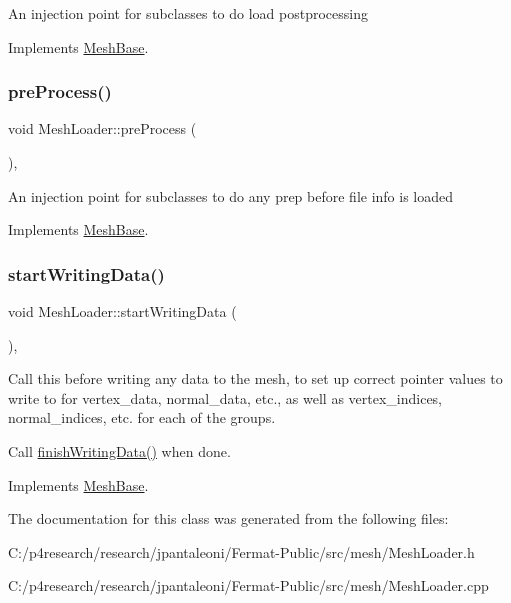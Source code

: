 An injection point for subclasses to do load postprocessing 

Implements \hyperlink{class_mesh_base_a49ec1a25d18103982974f424b77fadc0}{Mesh\+Base}.

\mbox{\label{class_mesh_loader_ad9c636920b31629f1c271b20a5fdc29b}} 
\subsubsection{\texorpdfstring{pre\+Process()}{preProcess()}}
{\footnotesize\ttfamily void Mesh\+Loader\+::pre\+Process (\begin{DoxyParamCaption}{ }\end{DoxyParamCaption})\hspace{0.3cm}{\ttfamily [protected]}, {\ttfamily [virtual]}}

An injection point for subclasses to do any prep before file info is loaded 

Implements \hyperlink{class_mesh_base_a25e192211e37cb69f9b5ce9aea25989a}{Mesh\+Base}.

\mbox{\label{class_mesh_loader_a18379e41707d8127947aa17a622d2807}} 
\subsubsection{\texorpdfstring{start\+Writing\+Data()}{startWritingData()}}
{\footnotesize\ttfamily void Mesh\+Loader\+::start\+Writing\+Data (\begin{DoxyParamCaption}{ }\end{DoxyParamCaption})\hspace{0.3cm}{\ttfamily [protected]}, {\ttfamily [virtual]}}

Call this before writing any data to the mesh, to set up correct pointer values to write to for vertex\+\_\+data, normal\+\_\+data, etc., as well as vertex\+\_\+indices, normal\+\_\+indices, etc. for each of the groups.

Call \hyperlink{class_mesh_loader_a65847db267f07f637deab0889c283bfa}{finish\+Writing\+Data()} when done. 

Implements \hyperlink{class_mesh_base_a67eb9bc7c4f6b074626078fe7779a8a4}{Mesh\+Base}.



The documentation for this class was generated from the following files\+:\begin{DoxyCompactItemize}
\item 
C\+:/p4research/research/jpantaleoni/\+Fermat-\/\+Public/src/mesh/Mesh\+Loader.\+h\item 
C\+:/p4research/research/jpantaleoni/\+Fermat-\/\+Public/src/mesh/Mesh\+Loader.\+cpp\end{DoxyCompactItemize}
